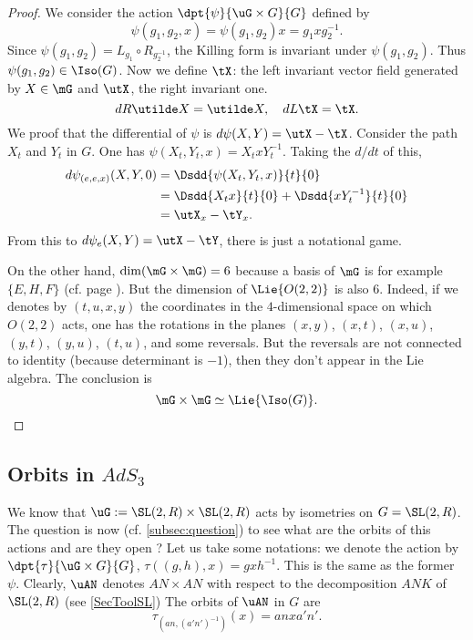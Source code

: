 \begin{proof}

We consider the action $\dpt{\psi}{\uG\times G}{G}$ defined by 
\[
   \psi(g_1,g_2,x)=\psi(g_1,g_2)x=g_1xg_2^{-1}.
\]
Since $\psi(g_1,g_2)=L_{g_1}\circ R_{g_2^{-1}}$, the Killing form is invariant under $\psi(g_1,g_2)$. Thus $\psi(g_1,g_2)\in\Iso(G)$. Now we define $\tX$: the left invariant vector field generated by $X\in\mG$ and $\utX$, the right invariant one.
\[
   dR\utilde X=\utilde X,\quad dL\tX=\tX.
\]
We proof that the differential of $\psi$ is $d\psi(X,Y)=\utX-\tX$. Consider the path $X_t$ and $Y_t$ in $G$. One has $\psi(X_t,Y_t,x)=X_txY_t^{-1}$. Taking the $d/dt$ of this,
\begin{equation}
\begin{split}
d\psi_{(e,e,x)}(X,Y,0)&=\Dsdd{\psi(X_t,Y_t,x)}{t}{0}\\
                      &=\Dsdd{X_tx}{t}{0}+\Dsdd{xY_t^{-1}}{t}{0}\\
                      &=\utX_x-\tY_x.
\end{split}
\end{equation}
From this to $d\psi_e(X,Y)=\utX-\tY$, there is just a notational game.

On the other hand, $\dim(\mG\times\mG)=6$ because a basis of $\mG$ is for example $\{E,H,F\}$ (cf. page \pageref{SecToolSL}). But the dimension of $\Lie{O(2,2)}$ is also $6$. Indeed, if we denotes by $(t,u,x,y)$ the coordinates in the $4$-dimensional space on which $O(2,2)$ acts, one has the rotations in the planes $(x,y)$, $(x,t)$, $(x,u)$, $(y,t)$, $(y,u)$, $(t,u)$, and some reversals. But the reversals are not connected to identity (because determinant is $-1$), then they don't appear in the Lie algebra.
The conclusion is 
\[
\mG\times\mG\simeq\Lie{\Iso(G)}.
\]

\end{proof}

\subsection{Orbits in \texorpdfstring{$AdS_3$}{AdS3}}

We know that $\uG:=\SL(2,R)\times\SL(2,R)$ acts by isometries on $G=\SL(2,R)$. The question is now (cf. \ref{subsec:question}) to see what are the orbits of this actions and are they open ? Let us take some notations: we denote the action by $\dpt{\tau}{\uG\times G}{G}$, $\tau((g,h),x)=gxh^{-1}$. This is the same as the former $\psi$. Clearly, $\uAN$ denotes $AN\times AN$ with respect to the decomposition $ANK$ of $\SL(2,R)$ (see \ref{SecToolSL}) The orbits of $\uAN$ in $G$ are
\[
   \tau_{ (an,(a'n')^{-1}) }(x)=anxa'n'.
\]

